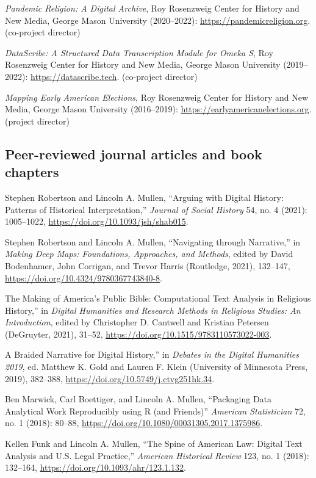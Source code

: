 \documentclass[11pt]{article}
\begin{document}
\emph{Pandemic Religion: A Digital Archive}, Roy Rosenzweig Center for History and New Media, George Mason University (2020--2022): \url{https://pandemicreligion.org}. (co-project director)

\emph{DataScribe: A Structured Data Transcription Module for Omeka S}, Roy Rosenzweig Center for History and New Media, George Mason University (2019--2022): \url{https://datascribe.tech}. (co-project director)

\emph{Mapping Early American Elections}, Roy Rosenzweig Center for History and New Media, George Mason University (2016--2019): \url{https://earlyamericanelections.org}. (project director)

\subsection{Peer-reviewed journal articles and book chapters}\label{Peer-reviewed articles and chapters}

Stephen Robertson and Lincoln A. Mullen, ``Arguing with Digital History: Patterns of Historical Interpretation,'' \emph{Journal of Social History} 54, no. 4 (2021): 1005--1022, \url{https://doi.org/10.1093/jsh/shab015}.

Stephen Robertson and Lincoln A. Mullen, ``Navigating through Narrative,'' in \emph{Making Deep Maps: Foundations, Approaches, and Methods}, edited by David Bodenhamer, John Corrigan, and Trevor Harris (Routledge, 2021), 132--147, \url{https://doi.org/10.4324/9780367743840-8}.

\noindent{}The Making of America's Public Bible: Computational Text Analysis in Religious History,'' in \emph{Digital Humanities and Research Methods in Religious Studies: An Introduction}, edited by Christopher D. Cantwell and 
Kristian Petersen (DeGruyter, 2021), 31--52, \url{https://doi.org/10.1515/9783110573022-003}.

\noindent{}A Braided Narrative for Digital History,'' in \emph{Debates in the Digital Humanities 2019}, ed. Matthew K. Gold and Lauren F. Klein (University of Minnesota Press, 2019), 382--388, \url{https://doi.org/10.5749/j.ctvg251hk.34}.

Ben Marwick, Carl Boettiger, and Lincoln A. Mullen, ``Packaging Data Analytical Work Reproducibly using R (and Friends)'' \emph{American Statistician} 72, no. 1 (2018): 80--88, \url{https://doi.org/10.1080/00031305.2017.1375986}.

Kellen Funk and Lincoln A. Mullen, ``The Spine of American Law: Digital Text Analysis and U.S. Legal Practice,'' \emph{American Historical Review} 123, no.  1 (2018): 132--164, \url{https://doi.org/10.1093/ahr/123.1.132}.
\end{document}
